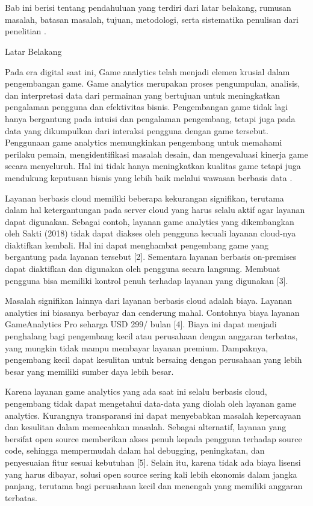\chapter{\babSatu}
\label{bab:1}
Bab ini berisi tentang pendahuluan yang terdiri dari latar belakang, rumusan masalah, batasan masalah, tujuan, metodologi, serta sistematika penulisan dari penelitian \cite{book:sample}.

Latar Belakang

Pada era digital saat ini, Game analytics telah menjadi elemen krusial dalam pengembangan game. Game analytics merupakan proses pengumpulan, analisis, dan interpretasi data dari permainan yang bertujuan untuk meningkatkan pengalaman pengguna dan efektivitas bisnis. Pengembangan game tidak lagi hanya bergantung pada intuisi dan pengalaman pengembang, tetapi juga pada data yang dikumpulkan dari interaksi pengguna dengan game tersebut. Penggunaan game analytics memungkinkan pengembang untuk memahami perilaku pemain, mengidentifikasi masalah desain, dan mengevaluasi kinerja game secara menyeluruh. Hal ini tidak hanya meningkatkan kualitas game tetapi juga mendukung keputusan bisnis yang lebih baik melalui wawasan berbasis data \cite{book:sample}​.

Layanan berbasis cloud memiliki beberapa kekurangan signifikan, terutama dalam hal ketergantungan pada server cloud yang harus selalu aktif agar layanan dapat digunakan. Sebagai contoh, layanan game analytics yang dikembangkan oleh Sakti (2018) tidak dapat diakses oleh pengguna kecuali layanan cloud-nya diaktifkan kembali. Hal ini dapat menghambat pengembang game yang bergantung pada layanan tersebut [2]. Sementara layanan berbasis on-premises dapat diaktifkan dan digunakan oleh pengguna secara langsung. Membuat pengguna bisa memiliki kontrol penuh terhadap layanan yang digunakan [3].

Masalah signifikan lainnya dari layanan berbasis cloud adalah biaya. Layanan analytics ini biasanya berbayar dan cenderung mahal. Contohnya biaya layanan GameAnalytics Pro seharga USD 299/ bulan [4]. Biaya ini dapat menjadi penghalang bagi pengembang kecil atau perusahaan dengan anggaran terbatas, yang mungkin tidak mampu membayar layanan premium. Dampaknya, pengembang kecil dapat kesulitan untuk bersaing dengan perusahaan yang lebih besar yang memiliki sumber daya lebih besar.

Karena layanan game analytics yang ada saat ini selalu berbasis cloud, pengembang tidak dapat mengetahui data-data yang diolah oleh layanan game analytics. Kurangnya transparansi ini dapat menyebabkan masalah kepercayaan dan kesulitan dalam memecahkan masalah. Sebagai alternatif, layanan yang bersifat open source memberikan akses penuh kepada pengguna terhadap source code, sehingga mempermudah dalam hal debugging, peningkatan, dan penyesuaian fitur sesuai kebutuhan​ [5]. Selain itu, karena tidak ada biaya lisensi yang harus dibayar, solusi open source sering kali lebih ekonomis dalam jangka panjang, terutama bagi perusahaan kecil dan menengah yang memiliki anggaran terbatas.

